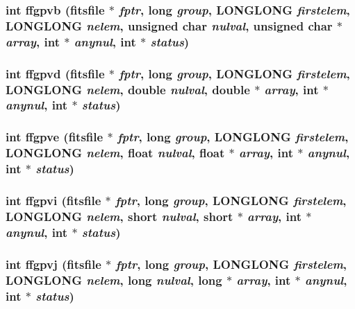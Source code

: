 \subsubsection{\setlength{\rightskip}{0pt plus 5cm}int ffgpvb (\bf{fitsfile} $\ast$ {\em fptr}, long {\em group}, \bf{LONGLONG} {\em firstelem}, \bf{LONGLONG} {\em nelem}, unsigned char {\em nulval}, unsigned char $\ast$ {\em array}, int $\ast$ {\em anynul}, int $\ast$ {\em status})}\label{fitsio__64_8h_8e74e883f394026b322166c514e89737}


\subsubsection{\setlength{\rightskip}{0pt plus 5cm}int ffgpvd (\bf{fitsfile} $\ast$ {\em fptr}, long {\em group}, \bf{LONGLONG} {\em firstelem}, \bf{LONGLONG} {\em nelem}, double {\em nulval}, double $\ast$ {\em array}, int $\ast$ {\em anynul}, int $\ast$ {\em status})}\label{fitsio__64_8h_360c62c59f25501d54be60fcc9d188a3}


\subsubsection{\setlength{\rightskip}{0pt plus 5cm}int ffgpve (\bf{fitsfile} $\ast$ {\em fptr}, long {\em group}, \bf{LONGLONG} {\em firstelem}, \bf{LONGLONG} {\em nelem}, float {\em nulval}, float $\ast$ {\em array}, int $\ast$ {\em anynul}, int $\ast$ {\em status})}\label{fitsio__64_8h_aec726a6192a5cb163c2be7496ba41ff}


\subsubsection{\setlength{\rightskip}{0pt plus 5cm}int ffgpvi (\bf{fitsfile} $\ast$ {\em fptr}, long {\em group}, \bf{LONGLONG} {\em firstelem}, \bf{LONGLONG} {\em nelem}, short {\em nulval}, short $\ast$ {\em array}, int $\ast$ {\em anynul}, int $\ast$ {\em status})}\label{fitsio__64_8h_5cf08cc899b11b18350ec1def017de1d}


\subsubsection{\setlength{\rightskip}{0pt plus 5cm}int ffgpvj (\bf{fitsfile} $\ast$ {\em fptr}, long {\em group}, \bf{LONGLONG} {\em firstelem}, \bf{LONGLONG} {\em nelem}, long {\em nulval}, long $\ast$ {\em array}, int $\ast$ {\em anynul}, int $\ast$ {\em status})}\label{fitsio__64_8h_5b4c250bd7e498f28600d4850216cb56}


